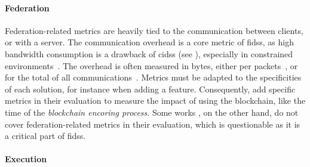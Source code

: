 \paragraph{Federation}

Federation-related metrics are heavily tied to the communication between clients, or with a server.
The communication overhead is a core metric of \glspl{fids}, as high bandwidth consumption is a drawback of \glspl{cids} (see ), especially in constrained environments~\cite{qin_LineSpeedScalableIntrusion_2020a}.
The overhead is often measured in bytes, either per packets~\cite{pahl_AllEyesYou_2018}, or for the total of all communications~\cite{schneble_Attackdetectionusing_2019,zhang_BlockchainbasedFederatedLearning_2020}.
Metrics must be adapted to the specificities of each solution, for instance when adding a feature.
Consequently, \textcite{zhang_BlockchainbasedFederatedLearning_2020} add specific metrics in their evaluation to measure the impact of using the blockchain, like the time of the \emph{blockchain encoring process}.
Some works \cite{rathore_BlockSecIoTNetBlockchainbaseddecentralized_2019,li_DeepFedFederatedDeep_2020,chen_Networkanomalydetection_2020,fan_IoTDefenderFederatedTransfer_2020,rahman_InternetThingsIntrusion_2020,al-athbaal-marri_FederatedMimicLearning_2020,popoola_FederatedDeepLearning_2021a,sun_IntrusionDetectionSegmented_2020}, on the other hand, do not cover federation-related metrics in their evaluation, which is questionable as it is a critical part of \glspl{fids}.

\paragraph{Execution}

